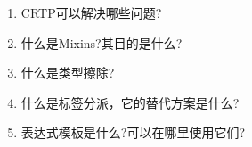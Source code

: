\begin{enumerate}
\item
CRTP可以解决哪些问题?

\item
什么是Mixins?其目的是什么?

\item
什么是类型擦除?

\item
什么是标签分派，它的替代方案是什么?

\item
表达式模板是什么?可以在哪里使用它们?
\end{enumerate}